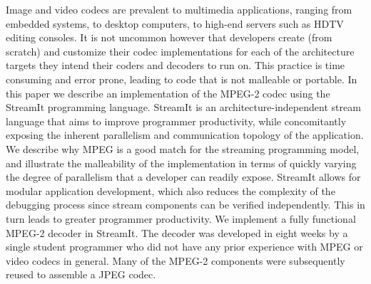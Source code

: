 Image and video codecs are prevalent to  multimedia applications,
ranging from embedded systems, to desktop computers, to high-end
servers such as HDTV editing consoles. It is  not uncommon however
that developers create (from scratch) and customize their codec
implementations for each of the architecture targets they intend their
coders and decoders to run on. This practice is time consuming and
error prone, leading to code that is not malleable or portable.  In
this paper we describe an implementation of the MPEG-2 codec using the
StreamIt programming language. StreamIt is an architecture-independent
stream language that aims to improve programmer productivity, while
concomitantly exposing the inherent parallelism and communication
topology of the application.  We describe why MPEG is a good match for
the streaming programming model, and illustrate the malleability of
the implementation in terms of quickly varying the degree of
parallelism that a developer can readily expose. StreamIt allows for
modular application development, which also reduces the complexity of
the debugging process since stream components can be verified
independently. This in turn leads to greater programmer productivity.
We implement a fully functional MPEG-2 decoder in StreamIt. The
decoder was developed in eight weeks by a single student programmer
who did not have any prior experience with MPEG or video codecs in
general. Many of the MPEG-2 components were subsequently reused to
assemble a JPEG codec.

